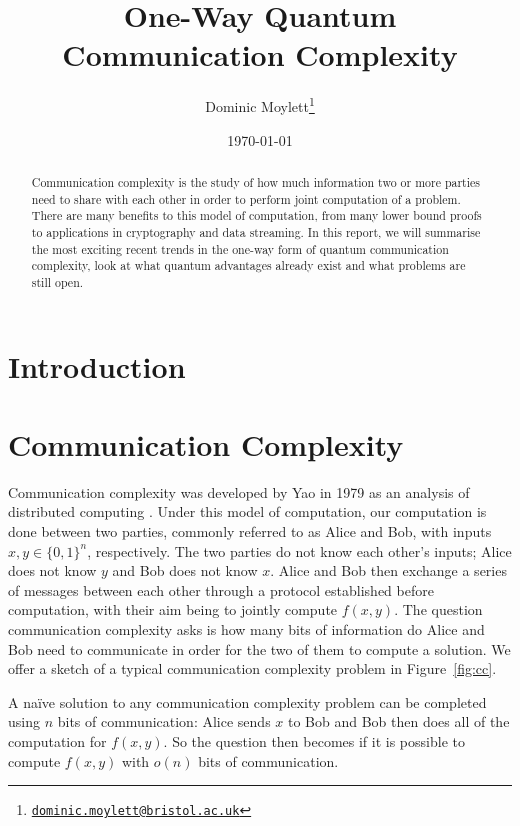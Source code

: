 \documentclass[a4paper]{article}
\begin{document}
    \title{One-Way Quantum Communication Complexity}
    \author{Dominic Moylett\thanks{\texttt{\href{dominic.moylett@bristol.ac.uk}{dominic.moylett@bristol.ac.uk}}}}
    \date{\today}
    \maketitle

    \begin{abstract}
        Communication complexity is the study of how much information two or more parties need to share with each other in order to perform joint computation of a problem. There are many benefits to this model of computation, from many lower bound proofs to applications in cryptography and data streaming. In this report, we will summarise the most exciting recent trends in the one-way form of quantum communication complexity, look at what quantum advantages already exist and what problems are still open.
    \end{abstract}

    \section{Introduction}

    \section{Communication Complexity}

        Communication complexity was developed by Yao in 1979 as an analysis of distributed computing \cite{Yao:1979:CQR:800135.804414}. Under this model of computation, our computation is done between two parties, commonly referred to as Alice and Bob, with inputs $x, y \in \{0, 1\}^n$, respectively. The two parties do not know each other's inputs; Alice does not know $y$ and Bob does not know $x$. Alice and Bob then exchange a series of messages between each other through a protocol established before computation, with their aim being to jointly compute $f(x, y)$. The question communication complexity asks is how many bits of information do Alice and Bob need to communicate in order for the two of them to compute a solution. We offer a sketch of a typical communication complexity problem in Figure~\ref{fig:cc}.

        A na\"{i}ve solution to any communication complexity problem can be completed using $n$ bits of communication: Alice sends $x$ to Bob and Bob then does all of the computation for $f(x, y)$. So the question then becomes if it is possible to compute $f(x, y)$ with $o(n)$ bits of communication.
\end{document}
